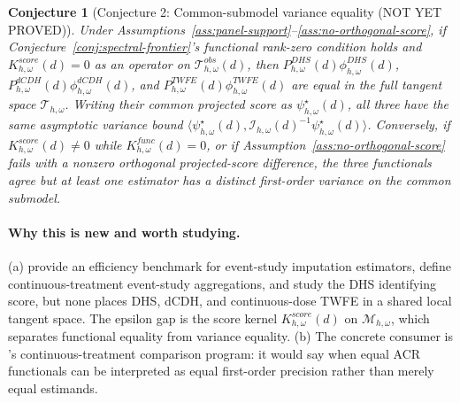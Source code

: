 \documentclass[11pt]{article}
\theoremstyle{definition}
\theoremstyle{plain}
\newtheorem{conjecture}{Conjecture}
\theoremstyle{remark}
\begin{document}
\begin{conjecture}[Conjecture 2: Common-submodel variance equality (NOT YET PROVED)]\label{conj:variance-equality}
Under Assumptions~\ref{ass:panel-support}--\ref{ass:no-orthogonal-score}, if Conjecture~\ref{conj:spectral-frontier}'s functional rank-zero condition holds and \(K^{score}_{h,\omega}(d)=0\) as an operator on \(\mathcal T^{obs}_{h,\omega}(d)\), then \(P^{DHS}_{h,\omega}(d)\phi^{DHS}_{h,\omega}(d)\), \(P^{dCDH}_{h,\omega}(d)\phi^{dCDH}_{h,\omega}(d)\), and \(P^{TWFE}_{h,\omega}(d)\phi^{TWFE}_{h,\omega}(d)\) are equal in the full tangent space \(\mathcal T_{h,\omega}\). Writing their common projected score as \(\psi^\star_{h,\omega}(d)\), all three have the same asymptotic variance bound \(\langle \psi^\star_{h,\omega}(d),\mathcal I_{h,\omega}(d)^{-1}\psi^\star_{h,\omega}(d)\rangle\). Conversely, if \(K^{score}_{h,\omega}(d)\neq 0\) while \(K^{func}_{h,\omega}(d)=0\), or if Assumption~\ref{ass:no-orthogonal-score} fails with a nonzero orthogonal projected-score difference, the three functionals agree but at least one estimator has a distinct first-order variance on the common submodel.
\end{conjecture}
\paragraph{Why this is new and worth studying.}
(a) \citet{BorusyakJaravelSpiess2024} provide an efficiency benchmark for event-study imputation estimators, \citet{CallawayGoodmanBaconSantAnna2024EventStudies} define continuous-treatment event-study aggregations, and \citet{DHaultfoeuilleHoderleinSasaki2023} study the DHS identifying score, but none places DHS, dCDH, and continuous-dose TWFE in a shared local tangent space. The epsilon gap is the score kernel \(K^{score}_{h,\omega}(d)\) on \(\mathcal M_{h,\omega}\), which separates functional equality from variance equality. (b) The concrete consumer is \citet{CallawayGoodmanBaconSantAnna2024}'s continuous-treatment comparison program: it would say when equal ACR functionals can be interpreted as equal first-order precision rather than merely equal estimands.
\end{document}
